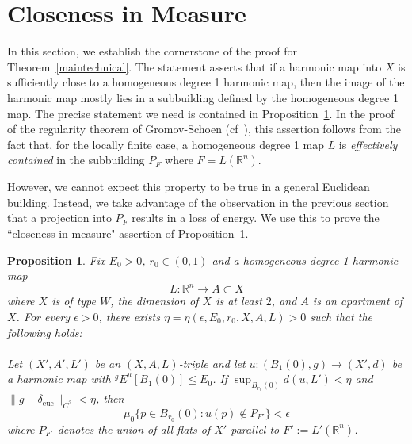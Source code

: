 \documentclass[12pt]{amsart}
\newtheorem{proposition}[theorem]{Proposition}
\theoremstyle{definition}
\numberwithin{equation}{section}
\newcommand{\R}{\mathbb R}
\newcommand{\deltae}{\delta_{\text{euc}}}
\begin{document}

\section{Closeness in Measure}
\label{sec:noregMeas}

In this section, we establish the cornerstone of the proof for Theorem~\ref{maintechnical}. The statement asserts that if a harmonic map into $X$ is sufficiently close to a homogeneous degree 1 harmonic map, then the image of the harmonic map mostly lies in a subbuilding defined by the homogeneous degree 1 map.  The precise statement we need is contained in Proposition~\ref{Sun Lemma 12 Collapsed}. In the proof of the regularity theorem of Gromov-Schoen (cf~\cite[Theorem 5.1]{gromov-schoen}), this assertion follows from the fact that, for the locally finite case, a  homogeneous degree 1 map $L$  is {\it effectively contained} in the subbuilding $P_F$ where $F=L(\R^n)$. 


However, we cannot expect this property to be true in a general Euclidean building.   Instead, we take advantage of the observation in the previous section that a projection into $P_F$ results in a  loss of energy.  We use this to prove the ``closeness in measure" assertion of  Proposition~\ref{Sun Lemma 12 Collapsed}.




\begin{proposition}\label{Sun Lemma 12 Collapsed} 
Fix $E_0>0$,  $r_0 \in (0,1)$ and a  homogeneous degree 1 harmonic map 
\[
L:\R^n \rightarrow A \subset X
\]
where $X$ is of type $W$, the dimension of $X$ is at least $2$, and $A$ is an apartment of $X$.
For every $\epsilon>0$,  there exists $\eta=\eta(\epsilon, E_0,r_0,X,A,L)>0$ such that the following holds:\\
\\
Let $(X',A',L')$ be an $(X,A,L)$-triple and let $u:(B_1(0),g)\to (X',d)$ be a harmonic map with ${^gE}^u[B_1(0)]\leq E_0$. 
 If  $\sup_{B_{r_0}(0)} d(u,L') < \eta$ 
 and $\|g-\deltae\|_{C^2}<\eta$,
then
\[
\mu_0\{p \in B_{r_0}(0):u(p) \notin P_{F'}\} < \epsilon
\]
where $P_{F'}$ denotes the union of all flats of $X'$ parallel to $F':=L'(\R^n)$.
\end{proposition}
\end{document}
